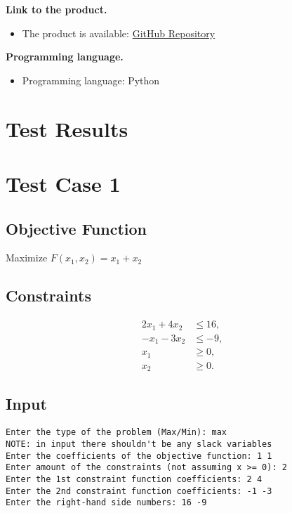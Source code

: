 \documentclass[12pt, legalpaper]{exam}
\begin{document}
\vspace{12pt}
\noindent     
\textbf{Link to the product.}
\begin{itemize}
    \item The product is available: \href{https://github.com/GodDamnMan/Optimization_prog_2}{GitHub Repository}
\end{itemize}

\vspace{12pt}

\noindent  \textbf{Programming language.}
\begin{itemize}
    \item Programming language:  Python
\end{itemize}

\vspace{12pt}
\newpage

\section*{Test Results}
\section*{Test Case 1}

\subsection*{Objective Function}
Maximize \( F(x_1, x_2) = x_1 + x_2 \)

\subsection*{Constraints}
\begin{align*}
    2x_1 + 4x_2 &\leq 16, \\
    -x_1 - 3x_2 &\leq -9, \\
    x_1 &\geq 0, \\
    x_2 &\geq 0.
\end{align*}

\subsection*{Input}
\begin{verbatim}
Enter the type of the problem (Max/Min): max
NOTE: in input there shouldn't be any slack variables
Enter the coefficients of the objective function: 1 1
Enter amount of the constraints (not assuming x >= 0): 2
Enter the 1st constraint function coefficients: 2 4
Enter the 2nd constraint function coefficients: -1 -3
Enter the right-hand side numbers: 16 -9
\end{verbatim}
\end{document}
